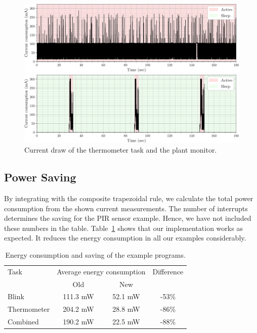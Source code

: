 \documentclass[runningheads]{llncs}
\begin{document}
\begin{figure}[ht]
	\centering
	\begin{minipage}{0.9\textwidth}
		\includegraphics[width=\textwidth]{complex-old-plot.pdf}
	\end{minipage}
	\begin{minipage}{0.9\textwidth}
		\includegraphics[width=\textwidth]{complex-plot.pdf}
	\end{minipage}
	\caption{Current draw of the thermometer task and the plant monitor.}%
	\label{fig:complex}
\end{figure}

\subsection{Power Saving}

By integrating with the composite trapezoidal rule, we calculate the total power consumption from the shown current measurements.
The number of interrupts determines the saving for the PIR sensor example.
Hence, we have not included these numbers in the table.
Table~\ref{tab:energy} shows that our implementation works as expected.
It reduces the energy consumption in all our examples considerably.

\begin{table}[ht]
	\centering
	\begin{tabular}{lccc}
		\toprule
		Task        & \multicolumn{2}{l}{Average energy consumption} & Difference \\
					& Old                    & New  &             \\
					\midrule

		Blink       & 111.3 mW               & 52.1 mW &   -53\%            \\
		Thermometer & 204.2 mW               & 28.8 mW &
		-86\%\\

		Combined & 190.2 mW               & 22.5 mW    & -88\%  \\
		\bottomrule
	\end{tabular}
	\caption{Energy consumption and saving of the example programs.}%
	\label{tab:energy}
\end{table}
\end{document}
